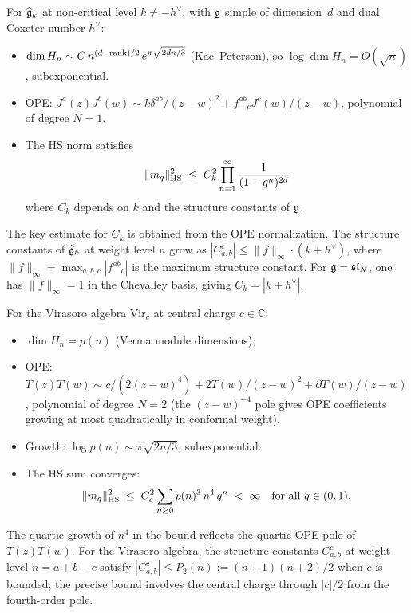 \begin{computation}
\label{comp:thqg-I-hs-affine}
For $\widehat{\mathfrak{g}}_k$ at non-critical level $k \neq -h^\vee$, with $\mathfrak{g}$ simple of dimension~$d$ and dual Coxeter number $h^\vee$:
\begin{itemize}
\item $\dim H_n \sim C\,n^{(d-\operatorname{rank})/2}\,e^{\pi\sqrt{2dn/3}}$ (Kac--Peterson), so $\log \dim H_n = O(\sqrt{n})$, subexponential.
\item OPE: $J^a(z)J^b(w) \sim k\delta^{ab}/(z-w)^2 + f^{ab}{}_c J^c(w)/(z-w)$, polynomial of degree $N = 1$.
\item The HS norm satisfies
 \begin{equation}\label{eq:thqg-I-hs-affine-norm}
 \|m_q\|_{\operatorname{HS}}^2 \;\leq\; C_k^2 \prod_{n=1}^\infty \frac{1}{(1-q^n)^{2d}}
 \end{equation}
 where $C_k$ depends on $k$ and the structure constants of $\mathfrak{g}$.
\end{itemize}
The key estimate for $C_k$ is obtained from the OPE normalization. The structure constants of $\widehat{\mathfrak{g}}_k$ at weight level $n$ grow as $|C^c_{a,b}| \leq \|f\|_\infty \cdot (k+h^\vee)$, where $\|f\|_\infty = \max_{a,b,c} |f^{ab}{}_c|$ is the maximum structure constant. For $\mathfrak{g} = \mathfrak{sl}_N$, one has $\|f\|_\infty = 1$ in the Chevalley basis, giving $C_k = |k + h^\vee|$.
\end{computation}

\begin{computation}
\label{comp:thqg-I-hs-virasoro}
For the Virasoro algebra $\mathrm{Vir}_c$ at central charge $c \in \mathbb{C}$:
\begin{itemize}
\item $\dim H_n = p(n)$ (Verma module dimensions);
\item OPE: $T(z)T(w) \sim c/(2(z-w)^4) + 2T(w)/(z-w)^2 + \partial T(w)/(z-w)$, polynomial of degree $N = 2$ (the $(z-w)^{-4}$ pole gives OPE coefficients growing at most quadratically in conformal weight).
\item Growth: $\log p(n) \sim \pi\sqrt{2n/3}$, subexponential.
\item The HS sum converges:
 \begin{equation}\label{eq:thqg-I-hs-virasoro-norm}
 \|m_q\|_{\operatorname{HS}}^2 \;\leq\; C_c^2 \sum_{n \geq 0} p(n)^3\,n^{4}\,q^n \;<\; \infty \quad\text{for all } q \in (0,1).
 \end{equation}
\end{itemize}
The quartic growth of $n^4$ in the bound reflects the quartic OPE pole of $T(z)T(w)$. For the Virasoro algebra, the structure constants $C^c_{a,b}$ at weight level $n = a + b - c$ satisfy $|C^c_{a,b}| \leq P_2(n) := (n+1)(n+2)/2$ when $c$ is bounded; the precise bound involves the central charge through $|c|/2$ from the fourth-order pole.
\end{computation}

